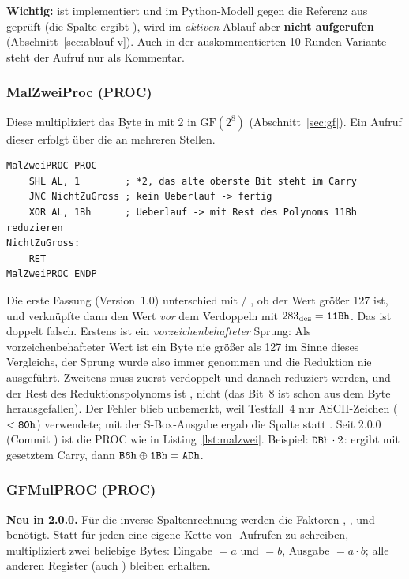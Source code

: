 \textbf{Wichtig:}  ist implementiert und im Python-Modell gegen die Referenz aus \cite{fips197} geprüft (die Spalte     ergibt    ), wird im \emph{aktiven} Ablauf aber \textbf{nicht aufgerufen} (Abschnitt~\ref{sec:ablauf-v}). Auch in der auskommentierten 10-Runden-Variante steht der Aufruf nur als Kommentar.

\subsubsection{MalZweiProc (PROC)}
Diese  multipliziert das Byte in  mit 2 in $\mathrm{GF}(2^8)$ (Abschnitt~\ref{sec:gf}). Ein Aufruf dieser  erfolgt über die  an mehreren Stellen.

\begin{lstlisting}[language=TASM,caption={\texttt{MalZweiPROC} (Version 2.0.0)},label={lst:malzwei}]
MalZweiPROC PROC
    SHL AL, 1        ; *2, das alte oberste Bit steht im Carry
    JNC NichtZuGross ; kein Ueberlauf -> fertig
    XOR AL, 1Bh      ; Ueberlauf -> mit Rest des Polynoms 11Bh reduzieren
NichtZuGross:
    RET
MalZweiPROC ENDP
\end{lstlisting}

Die erste Fassung (Version~1.0) unterschied mit  / , ob der Wert größer 127 ist, und verknüpfte dann den Wert \emph{vor} dem Verdoppeln mit $283_{\text{dez}}=\texttt{11Bh}$. Das ist doppelt falsch. Erstens ist  ein \emph{vorzeichenbehafteter} Sprung: Als vorzeichenbehafteter Wert ist ein Byte nie größer als 127 im Sinne dieses Vergleichs, der Sprung wurde also immer genommen und die Reduktion nie ausgeführt. Zweitens muss zuerst verdoppelt und danach reduziert werden, und der Rest des Reduktionspolynoms ist , nicht  (das Bit~8 ist schon aus dem Byte herausgefallen). Der Fehler blieb unbemerkt, weil Testfall~4 nur ASCII-Zeichen ($<\texttt{80h}$) verwendete; mit der S-Box-Ausgabe ergab die Spalte         statt    . Seit 2.0.0 (Commit ) ist die PROC wie in Listing~\ref{lst:malzwei}. Beispiel: $\texttt{DBh}\cdot2$:  ergibt  mit gesetztem Carry, dann $\texttt{B6h}\oplus\texttt{1Bh}=\texttt{ADh}$.

\subsubsection{GFMulPROC (PROC)}\label{sec:gfmulproc}
\textbf{Neu in 2.0.0.} Für die inverse Spaltenrechnung werden die Faktoren , ,  und  benötigt. Statt für jeden eine eigene Kette von -Aufrufen zu schreiben, multipliziert  zwei beliebige Bytes: Eingabe  $=a$ und  $=b$, Ausgabe  $=a\cdot b$; alle anderen Register (auch ) bleiben erhalten.


